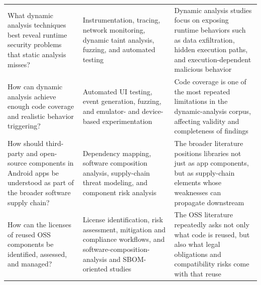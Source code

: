 \documentclass[12pt,a4paper]{report}
\begin{document}
{\begin{longtable}{>{\raggedright\arraybackslash}p{}>{\raggedright\arraybackslash}p{}>{\raggedright\arraybackslash}p{}}
What dynamic analysis techniques best reveal runtime security problems that static analysis misses? \parencite{sutterDynamicSecurityAnalysis2024} & Instrumentation, tracing, network monitoring, dynamic taint analysis, fuzzing, and automated testing & Dynamic analysis studies focus on exposing runtime behaviors such as data exfiltration, hidden execution paths, and execution-dependent malicious behavior \\

How can dynamic analysis achieve enough code coverage and realistic behavior triggering? \parencite{sutterDynamicSecurityAnalysis2024} & Automated UI testing, event generation, fuzzing, and emulator- and device-based experimentation & Code coverage is one of the most repeated limitations in the dynamic-analysis corpus, affecting validity and completeness of findings \\

How should third-party and open-source components in Android apps be understood as part of the broader software supply chain? \parencite{reichertSoftwareSupplyChain2024,williamsResearchDirectionsSoftware2025} & Dependency mapping, software composition analysis, supply-chain threat modeling, and component risk analysis & The broader literature positions libraries not just as app components, but as supply-chain elements whose weaknesses can propagate downstream \\

How can the licenses of reused OSS components be identified, assessed, and managed? \parencite{liOpenSourceHidden2025} & License identification, risk assessment, mitigation and compliance workflows, and software-composition-analysis and SBOM-oriented studies & The OSS literature repeatedly asks not only what code is reused, but also what legal obligations and compatibility risks come with that reuse \\
\end{longtable}
}
\end{document}

